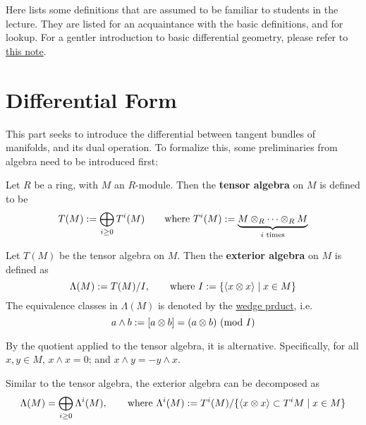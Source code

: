 \documentclass{article}
\begin{document}

\tableofcontents
\newpage

\def\open{\mathcal{O}}

Here lists some definitions that are assumed to be familiar to students in the lecture. They are listed for an acquaintance with the basic definitions, and for lookup. For a gentler introduction to basic differential geometry, please refer to \href{https://github.com/ARessegetesStery/MATH437-Notes}{this note}.

\section{Differential Form}

This part seeks to introduce the differential between tangent bundles of manifolds, and its dual operation. To formalize this, some preliminaries from algebra need to be introduced first:

\begin{definition}
    Let $R$ be a ring, with $M$ an $R$-module. Then the \textbf{tensor algebra} on $M$ is defined to be
    \[
        T(M) := \bigoplus_{i \geq 0} T^i(M) \qquad\text{where } T^i(M) := \underbrace{M \otimes_R \cdots \otimes_R M}_{i \text{ times}}
    \]
\end{definition}

\begin{definition}
    Let $T(M)$ be the tensor algebra on $M$. Then the \textbf{exterior algebra} on $M$ is defined as
    \[
        \Lambda(M) := T(M) / I , \qquad \text{where } I := \left\{ \left\langle x \otimes x \right\rangle \mid x \in M \right\}
    \]
    The equivalence classes in $\Lambda(M)$ is denoted by the \underline{wedge prduct}, i.e.
    \[
        a \wedge b := [a \otimes b] = (a \otimes b) \ (\text{mod}\ I)
    \]
\end{definition}

\begin{remark}
    By the quotient applied to the tensor algebra, it is alternative. Specifically, for all $x, y \in M$, $x \wedge x = 0$; and $x \wedge y = -y \wedge x$.
\end{remark}

\begin{remark}
    Similar to the tensor algebra, the exterior algebra can be decomposed as
    \[
        \Lambda(M) = \bigoplus_{i \geq 0} \Lambda^i(M), \qquad \text{where } \Lambda^i(M) := T^i(M) / \{ \left\langle x \otimes x \right\rangle \subset T^i M \mid x \in M \}
    \]
\end{remark}
\end{document}
